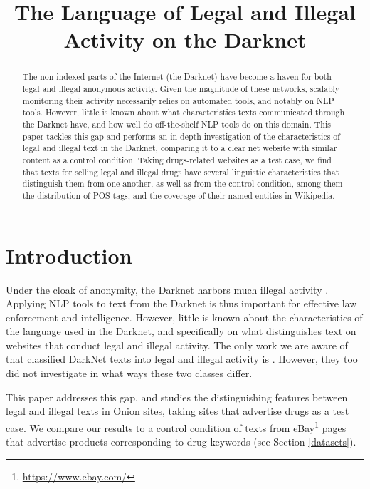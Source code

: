 \documentclass[11pt,a4paper,table]{article}
\title{The Language of Legal and Illegal Activity on the Darknet}
\date{}
\newcommand{\daniel}[1]{\footnote{\color{brown}DH: #1}}
\newcommand{\es}[1]{\footnote{\color{purple}ES: #1}}
\begin{document}
\maketitle

\begin{abstract}
  The non-indexed parts of the Internet (the Darknet)
   have become a haven for both legal and illegal anonymous activity.
  Given the magnitude of these networks, scalably monitoring their activity necessarily relies
    on automated tools, and notably on NLP tools.
  However, little is known about what characteristics texts communicated through the Darknet have, 
    and how well do off-the-shelf NLP tools do on this domain.
  This paper tackles this gap and performs an in-depth investigation of the characteristics
    of legal and illegal text in the Darknet, comparing it to a clear net website with similar
    content as a control condition.
  Taking drugs-related websites as a test case, we find that texts for selling legal and illegal drugs
    have several linguistic characteristics that distinguish them from one another, as well as from 
    the control condition, among them the distribution of POS tags, and the coverage of their named entities in Wikipedia.
\end{abstract}



\section{Introduction}
  
  Under the cloak of anonymity, the Darknet harbors much illegal activity \citep{moore2016cryptopolitik}.
  Applying NLP tools to text from the Darknet is thus important for effective law enforcement and intelligence.
  However, little is known about the characteristics of the language used in the Darknet, 
  and specifically on what distinguishes text on websites that conduct legal and illegal activity.
	The only work we are aware of that classified DarkNet texts into legal and illegal activity is \citep{Avarikioti18}.
	However, they too did not investigate in what ways these two classes differ.
  
  
  This paper addresses this gap, and studies the distinguishing features between legal and illegal texts in Onion sites,
  taking sites that advertise drugs as a test case. We compare our results to a control condition of texts 
  from eBay\footnote{\url{https://www.ebay.com/}} pages that 
	advertise products corresponding to drug keywords (see Section \ref{datasets}).
 
\end{document}
